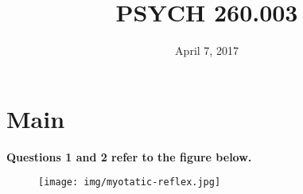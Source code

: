 \documentclass[answers]{exam}
\title{PSYCH 260.003}
\author{}
\date{April 7, 2017}
\begin{document}
\maketitle

\begin{center}
\end{center}
\vspace{0.1in}

\newpage

\section{Main}

\textbf{Questions 1 and 2 refer to the figure below.}

\begin{figure}[h]
\texttt{[image: img/myotatic-reflex.jpg]}
\centering
\end{figure}
\end{document}
